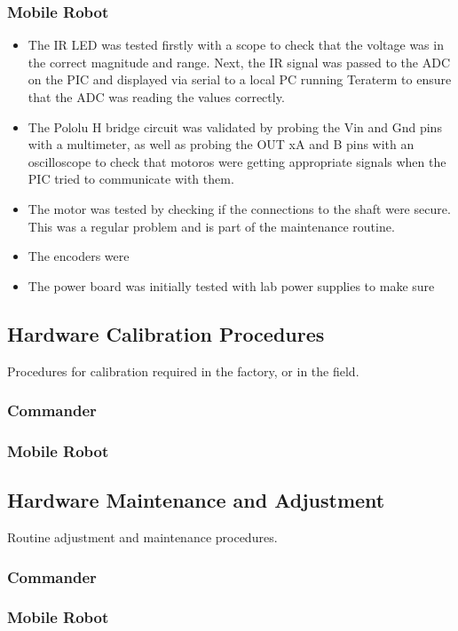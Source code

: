\documentclass[11pt,a4paper]{article}
\begin{document}
    \subsubsection{Mobile Robot}
      \begin{itemize}
        \item The IR LED was tested firstly with a scope to check that the voltage was in the correct magnitude and range. Next, the IR signal was passed to the ADC on the PIC and displayed via serial to a local PC running Teraterm to ensure that the ADC was reading the values correctly.
        \item The Pololu H bridge circuit was validated by probing the Vin and Gnd pins with a multimeter, as well as probing the OUT xA and B pins with an oscilloscope to check that motoros were getting appropriate signals when the PIC tried to communicate with them.
        \item The motor was tested by checking if the connections to the shaft were secure. This was a regular problem and is part of the maintenance routine.
        \item The encoders were
        \item The power board was initially tested with lab power supplies to make sure

      \end{itemize}

  \subsection{Hardware Calibration Procedures}
    Procedures for calibration required in the factory, or in the field.
    \subsubsection{Commander}
    \subsubsection{Mobile Robot}

  \subsection{Hardware Maintenance and Adjustment}
    Routine adjustment and maintenance procedures.
    \subsubsection{Commander}
    \subsubsection{Mobile Robot}
\end{document}
